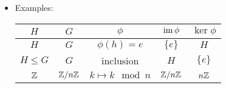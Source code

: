 \documentclass[../notes.tex]{subfiles}
\begin{document}
\begin{itemize}
\begin{proof}
        Claim 1: We know that $\phi(e_H)=e_G$, so
        \begin{equation*}
            \im\phi \neq \emptyset
        \end{equation*}
        as desired. Next, let $g_1,g_2\in\im\phi$. Suppose $g_1=\phi(h_1)$ and $g_2=\phi(h_2)$. Then since $H$ is closed under multiplication as a subgroup, $h_1h_2\in H$. It follows that
        \begin{equation*}
            g_1g_2 = \phi(h_1)\phi(h_2)
            = \phi(h_1h_2)
            \in \im\phi
        \end{equation*}
        as desired. Lastly, let $g\in\im\phi$. Suppose $g=\phi(h)$. Then since $H$ is closed under inverses as a subgroup, $h^{-1}\in H$. It follows that
        \begin{equation*}
            g^{-1} = \phi(h)^{-1}
            = \phi(h^{-1})
            \in \im\phi
        \end{equation*}
        as desired.\par
        Claim 2: We know that $\phi(e_H)=e_G$, so
        \begin{equation*}
            \ker\phi \neq \emptyset
        \end{equation*}
        as desired. Next, let $g_1,g_2\in\ker\phi$. Then
        \begin{equation*}
            e_G = e_Ge_G
            = \phi(g_1)\phi(g_2)
            = \phi(g_1g_2)
        \end{equation*}
        so $g_1g_2\in\ker\phi$, as desired. Lastly, let $g\in\ker\phi$. Then
        \begin{equation*}
            e_G = \phi(e_H)
            = \phi(gg^{-1})
            = \phi(g)\phi(g^{-1})
            = e_G\phi(g^{-1})
            = \phi(g^{-1})
        \end{equation*}
    \end{proof}
    \item Examples:
    \begin{table}[H]
        \centering
        \small
        \renewcommand{\arraystretch}{1.2}
        \begin{tabular}{c|c|c|c|c}
            $H$ & $G$ & $\phi$ & $\operatorname{im}\phi$ & $\ker\phi$\\
            \hline
            $H$ & $G$ & $\phi(h)=e$ & $\{e\}$ & $H$\\
            $H\leq G$ & $G$ & inclusion & $H$ & $\{e\}$\\
            $\mathbb{Z}$ & $\mathbb{Z}/n\mathbb{Z}$ & $k\mapsto k\mod n$ & $\mathbb{Z}/n\mathbb{Z}$ & $n\mathbb{Z}$\\

\end{tabular}
\end{table}
\end{itemize}
\end{document}

